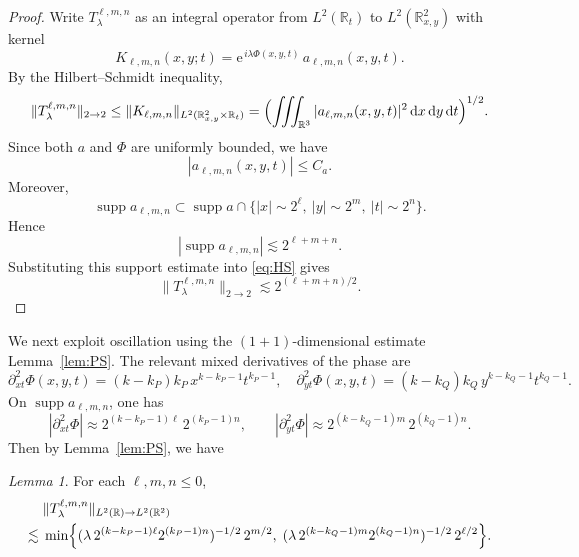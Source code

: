 \documentclass[10pt]{amsart}
\numberwithin{equation}{section}
\theoremstyle{definition}
\theoremstyle{remark}
\theoremstyle{remark}
\newtheorem{lemma}{Lemma}
\newcommand{\R}{\mathbb{R}}
\newcommand{\e}{\mathrm{e}}
\newcommand{\supp}{\operatorname{supp}}
\begin{document}
	\begin{proof}
		Write $T_{\lambda}^{\ell,m,n}$ as an integral operator from $L^2(\R_t)$ to $L^2(\R^2_{x,y})$ with kernel
		\[
		K_{\ell,m,n}(x,y;t)
		=
		\e^{\,i\lambda\Phi(x,y,t)}\,a_{\ell,m,n}(x,y,t).
		\]
		By the Hilbert--Schmidt inequality,
		\begin{equation}\label{eq:HS}
			\|T_{\lambda}^{\ell,m,n}\|_{2\to2}
			\le
			\|K_{\ell,m,n}\|_{L^2(\R^2_{x,y}\times\R_t)}
			=
			\Bigl(\iiint_{\R^3}|a_{\ell,m,n}(x,y,t)|^2\,\mathrm dx\,\mathrm dy\,\mathrm dt\Bigr)^{1/2}.
		\end{equation}
			Since both $a$ and $\Phi$ are uniformly bounded, we have
			\[
			|a_{\ell,m,n}(x,y,t)|\le C_a.
			\]
			Moreover,
			\[
			\supp a_{\ell,m,n}
			\subset
			\supp a\cap
			\{ |x|\sim 2^\ell,\ |y|\sim 2^m,\ |t|\sim 2^n\}.
			\]
			Hence
			\[
			|\supp a_{\ell,m,n}|
			\lesssim
			2^{\ell+m+n}.
			\]
			Substituting this support estimate into \eqref{eq:HS} gives
			\[
			\|T_{\lambda}^{\ell,m,n}\|_{2\to2}
			\lesssim
			2^{(\ell+m+n)/2}.
			\]
	\end{proof}
	
	We next exploit oscillation using the $(1+1)$-dimensional estimate Lemma~\ref{lem:PS}.
	The relevant mixed derivatives of the phase are
	\begin{equation*}
		\partial_{xt}^2\Phi(x,y,t)
		=
		(k-k_P)k_P\,x^{k-k_P-1}t^{k_P-1},
		\quad
		\partial_{yt}^2\Phi(x,y,t)
		=
		(k-k_Q)k_Q\,y^{k-k_Q-1}t^{k_Q-1}.
	\end{equation*}
	On $\supp a_{\ell,m,n}$, one has
	\begin{equation}\label{eq:mu}
		|\partial_{xt}^2\Phi|
		\approx
		2^{(k-k_P-1)\ell}\,2^{(k_P-1)n},
		\qquad
		|\partial_{yt}^2\Phi|
		\approx
		2^{(k-k_Q-1)m}\,2^{(k_Q-1)n}.
	\end{equation}
		Then by Lemma~\ref{lem:PS}, we have
	\begin{lemma}\label{lem:osc}
		For each $\ell,m,n\le 0$,
		\begin{align}\label{eq:osc}
			\begin{split}
				&\|T_{\lambda}^{\ell,m,n}\|_{L^2(\R)\to L^2(\R^2)}
				\\
				\lesssim\;
				&\min\Bigl\{
				(\lambda\,2^{(k-k_P-1)\ell}2^{(k_P-1)n})^{-1/2}\,2^{m/2},\;
				(\lambda\,2^{(k-k_Q-1)m}2^{(k_Q-1)n})^{-1/2}\,2^{\ell/2}
				\Bigr\}.
			\end{split}
		\end{align}
	\end{lemma}
	
\end{document}
